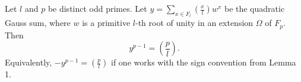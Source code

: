 Let $l$ and $p$ be distinct odd primes. Let $y = \sum_{x \in F_l} \left(\frac{x}{l}\right) w^x$ be the quadratic Gauss sum, where $w$ is a primitive $l$-th root of unity in an extension $\Omega$ of $F_p$. Then
$$y^{p-1} = \left( \frac{p}{l} \right).$$
Equivalently, $-y^{p-1} = \left( \frac{p}{l} \right)$ if one works with the sign convention from Lemma 1.
